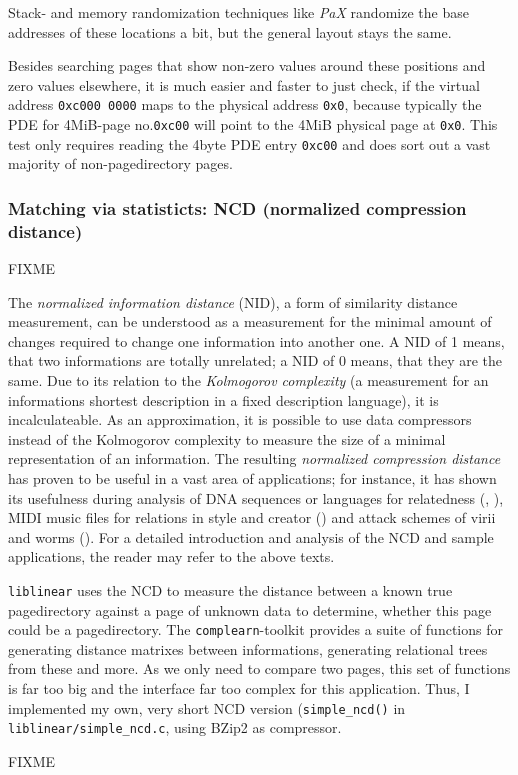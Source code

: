 Stack- and memory randomization techniques like \emph{PaX} randomize the base
addresses of these locations a bit, but the general layout stays the same.

Besides searching pages that show non-zero values around these positions and
zero values elsewhere, it is much easier and faster to just check, if the
virtual address \texttt{0xc000~0000} maps to the physical address \texttt{0x0},
because typically the PDE for 4MiB-page no.\@ \texttt{0xc00} will point to the
4MiB physical page at \texttt{0x0}. This test only requires reading the 4byte
PDE entry \texttt{0xc00} and does sort out a vast majority of non-pagedirectory
pages.



\subsubsection{Matching via statisticts: NCD (normalized compression distance)}

FIXME

The \emph{normalized information distance} (NID), a form of similarity distance
measurement, can be understood as a measurement for the minimal amount of
changes required to change one information into another one.  A NID of 1 means,
that two informations are totally unrelated; a NID of 0 means, that they are the
same.  Due to its relation to the \emph{Kolmogorov complexity} (a measurement
for an informations shortest description in a fixed description language), it is
incalculateable.  As an approximation, it is possible to use data compressors
instead of the Kolmogorov complexity to measure the size of a minimal
representation of an information. The resulting \emph{normalized compression
distance} has proven to be useful in a vast area of applications; for instance,
it has shown its usefulness during analysis of DNA sequences or languages for
relatedness (\cite{clustering_by_compression:2005},
\cite{similarity_matrix:2004}), MIDI music files for relations in style and
creator (\cite{clustering_by_compression:2005}) and attack schemes of virii and
worms (\cite{analysing_worms_with_ncd:2006}).  For a detailed introduction and
analysis of the NCD and sample applications, the reader may refer to the above
texts.

\texttt{liblinear} uses the NCD to measure the distance between a known true
pagedirectory against a page of unknown data to determine, whether this page
could be a pagedirectory. The \texttt{complearn}-toolkit
\cite{complearn_homepage} provides a suite of functions for generating distance
matrixes between informations, generating relational trees from these and more.
As we only need to compare two pages, this set of functions is far too big and
the interface far too complex for this application. Thus, I implemented my own,
very short NCD version (\texttt{simple\_ncd()} in
\texttt{liblinear/simple\_ncd.c}, using BZip2 as compressor.

FIXME

